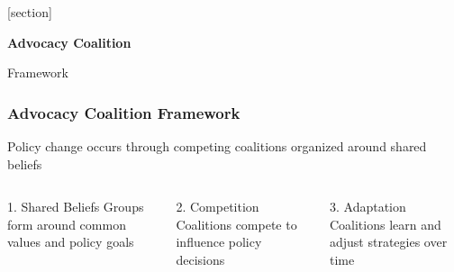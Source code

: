 \documentclass[10pt]{beamer}
\begin{document}
{
[section]
\begin{frame}[plain]
  \vspace{2cm}
  \begin{center}
    {\Huge\color{white}\textbf{Advocacy Coalition}}

    \vspace{0.5cm}
    {\Large\color{white}Framework}
  \end{center}
\end{frame}
}

\begin{frame}
\frametitle{Advocacy Coalition Framework}

\begin{block}{}
  \centering
  Policy change occurs through competing coalitions organized around shared beliefs
\end{block}

\vspace{0.5cm}

\begin{columns}
  \begin{column}{0.32\textwidth}
    \begin{block}{1. Shared Beliefs}
      \pause
      Groups form around common values and policy goals
    \end{block}
  \end{column}

  \begin{column}{0.32\textwidth}
    \begin{block}{2. Competition}
      \pause
      Coalitions compete to influence policy decisions
    \end{block}
  \end{column}

  \begin{column}{0.32\textwidth}
    \begin{block}{3. Adaptation}
      \pause
      Coalitions learn and adjust strategies over time
    \end{block}
  \end{column}
\end{columns}

\end{frame}
\end{document}
